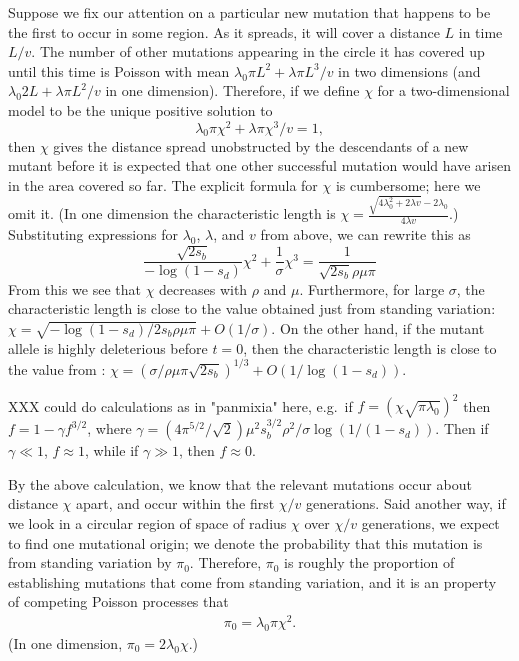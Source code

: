 \documentclass{article}
\begin{document}
Suppose we fix our attention on a particular new mutation that happens to be the first to occur in some region.
As it spreads, it will cover a distance $L$ in time $L/v$.
The number of other mutations appearing in the circle it has covered up until this time is Poisson with mean
$\lambda_0 \pi L^2 + \lambda \pi L^3 /v$ in two dimensions
(and $\lambda_0 2 L + \lambda \pi L^2 /v$ in one dimension).
Therefore, if we define $\chi$ for a two-dimensional model to be the unique positive solution to
\[
    \lambda_0 \pi \chi^2 + \lambda \pi \chi^3 /v = 1,
\]
then $\chi$ gives the distance spread unobstructed by the descendants of a new mutant
before it is expected that one other successful mutation would have arisen in the area covered so far.
The explicit formula for $\chi$ is cumbersome; here we omit it.
(In one dimension the characteristic length is $\chi = \frac{ \sqrt{ 4 \lambda_0^2 + 2\lambda v } - 2 \lambda_0 }{ 4 \lambda v }$.)
Substituting expressions for $\lambda_0$, $\lambda$, and $v$ from above,
we can rewrite this as
\begin{equation} \label{eqn:defines_chi}
   \frac{\sqrt{2s_b} }{-\log(1-s_d) } \chi^2 + \frac{1}{\sigma} \chi^3 = \frac{1}{\sqrt{2s_b} \rho\mu\pi}
\end{equation}
From this we see that $\chi$ decreases with $\rho$ and $\mu$.
Furthermore, for large $\sigma$, the characteristic length is close to the value obtained just from standing variation:
$\chi = \sqrt{ -\log(1-s_d) / 2 s_b \rho \mu \pi } + O(1/\sigma)$.
On the other hand, if the mutant allele is highly deleterious before $t=0$,
then the characteristic length is close to the value from \citet{ralphcoop2010}:
$\chi = ( \sigma / \rho \mu \pi \sqrt{2 s_b} )^{1/3} + O(1/\log(1-s_d))$.

XXX could do calculations as in "panmixia" here, e.g.\ if $f = (\chi \sqrt{\pi \lambda_0})^2$ then
$f = 1-\gamma f^{3/2}$, where
$\gamma = (4 \pi^{5/2} / \sqrt{2}) \mu^2 s_b^{3/2} \rho^2 / \sigma \log(1/(1-s_d))$.
Then if $\gamma \ll 1$, $f \approx 1$, while if $\gamma \gg 1$, then $f \approx 0$.

By the above calculation, we know that the relevant mutations occur about distance $\chi$ apart, 
and occur within the first $\chi/v$ generations.
Said another way, if we look in a circular region of space of radius $\chi$ over $\chi/v$ generations,
we expect to find one mutational origin;
we denote the probability that this mutation is from standing variation by $\pi_0$.
Therefore, $\pi_0$ is roughly the proportion of establishing mutations that come from standing variation,
and it is an property of competing Poisson processes that
\begin{align} \label{eqn:pizero}
    \pi_0 = \lambda_0 \pi \chi^2 .
\end{align}
(In one dimension, $\pi_0 = 2 \lambda_0 \chi$.)
\end{document}
